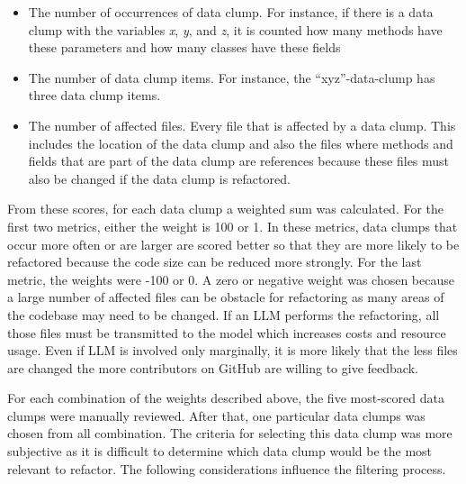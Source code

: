 \begin{itemize}
    \item The number of occurrences of data clump. For instance, if there is a data clump with the variables \textit{x}, \textit{y}, and  \textit{z}, it is counted how many methods have these parameters and how many classes have these fields

     \item The number of data clump items. For instance, the \enquote{xyz}-data-clump has three data clump items.
     
    \item The number of affected files. Every file that is affected by a data clump. This includes the location of the data clump and also the files where methods and fields that are part of the data clump are references because these files must also be changed if the data clump is refactored. 
    
\end{itemize}

From these scores, for each data clump a weighted sum was calculated. For the first two metrics, either the weight is 100 or 1. In these metrics, data clumps that occur more often or are larger are scored better so that they are more likely to be refactored because the code size can be reduced more strongly.  For the last metric, the weights were -100 or 0. A zero or negative weight was chosen because a large number of affected files can be obstacle for  refactoring as many areas of the codebase may need to be changed. If an \ac{LLM} performs the refactoring, all those files must be transmitted to the model which increases costs and resource usage. Even if \ac{LLM} is involved only marginally, it is more likely that the less files are changed the more contributors on GitHub are willing to give feedback.

For each combination of the weights described above, the five most-scored data clumps were manually reviewed. After that, one particular data clumps was  chosen from all combination. The criteria for selecting this data clump was more subjective as it is difficult to determine which data clump would be  the most relevant to refactor. The following considerations influence the filtering process.

